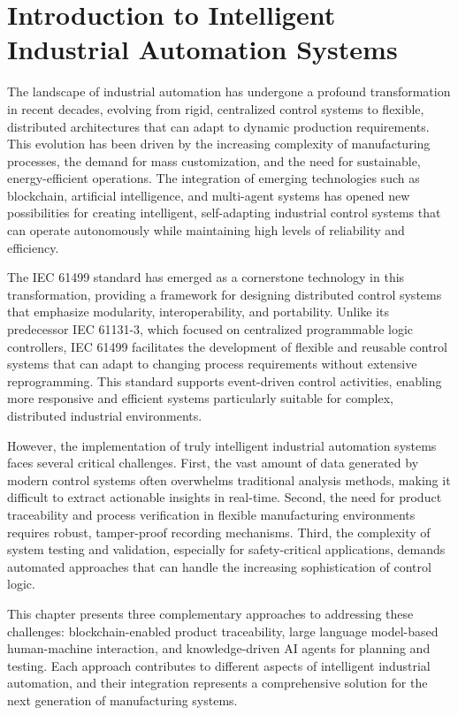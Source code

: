
\section{Introduction to Intelligent Industrial Automation Systems}

The landscape of industrial automation has undergone a profound transformation in recent decades, evolving from rigid, centralized control systems to flexible, distributed architectures that can adapt to dynamic production requirements. This evolution has been driven by the increasing complexity of manufacturing processes, the demand for mass customization, and the need for sustainable, energy-efficient operations. The integration of emerging technologies such as blockchain, artificial intelligence, and multi-agent systems has opened new possibilities for creating intelligent, self-adapting industrial control systems that can operate autonomously while maintaining high levels of reliability and efficiency.

The IEC 61499 standard has emerged as a cornerstone technology in this transformation, providing a framework for designing distributed control systems that emphasize modularity, interoperability, and portability. Unlike its predecessor IEC 61131-3, which focused on centralized programmable logic controllers, IEC 61499 facilitates the development of flexible and reusable control systems that can adapt to changing process requirements without extensive reprogramming. This standard supports event-driven control activities, enabling more responsive and efficient systems particularly suitable for complex, distributed industrial environments.

However, the implementation of truly intelligent industrial automation systems faces several critical challenges. First, the vast amount of data generated by modern control systems often overwhelms traditional analysis methods, making it difficult to extract actionable insights in real-time. Second, the need for product traceability and process verification in flexible manufacturing environments requires robust, tamper-proof recording mechanisms. Third, the complexity of system testing and validation, especially for safety-critical applications, demands automated approaches that can handle the increasing sophistication of control logic.

This chapter presents three complementary approaches to addressing these challenges: blockchain-enabled product traceability, large language model-based human-machine interaction, and knowledge-driven AI agents for planning and testing. Each approach contributes to different aspects of intelligent industrial automation, and their integration represents a comprehensive solution for the next generation of manufacturing systems.

